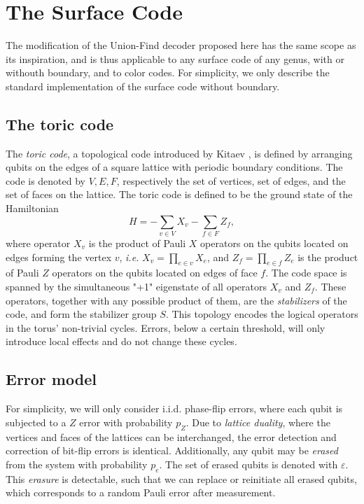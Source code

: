 \section{The Surface Code}\label{sec:surfacecode}

The modification of the Union-Find decoder proposed here has the same scope as its inspiration, and is thus applicable to any surface code of any genus, with or withouth boundary, and to color codes. For simplicity, we only describe the standard implementation of the surface code without boundary.

\subsection{The toric code}

The \emph{toric code}, a topological code introduced by Kitaev \cite{kitaev2003fault}, is defined by arranging qubits on the edges of a square lattice with periodic boundary conditions. The code is denoted by $V,E,F$, respectively the set of vertices, set of edges, and the set of faces on the lattice. The toric code is defined to be the ground state of the Hamiltonian 
\begin{equation}
    H = -\sum_{v \in V} X_v -\sum_{f \in F} Z_f, 
\end{equation}
where operator $X_v$ is the product of Pauli $X$ operators on the qubits located on edges forming the vertex $v$, \emph{i.e.} $X_v = \prod_{e \in v} X_e$, and $Z_f = \prod_{e \in f} Z_e$ is the product of Pauli $Z$ operators on the qubits located on edges of face $f$. The code space is spanned by the simultaneous "+1" eigenstate of all operators $X_v$ and $Z_f$. These operators, together with any possible product of them, are the \emph{stabilizers} of the code, and form the stabilizer group $S$. This topology encodes the logical operators in the torus' non-trivial cycles. Errors, below a certain threshold, will only introduce local effects and do not change these cycles.

\subsection{Error model}
For simplicity, we will only consider i.i.d. phase-flip errors, where each qubit is subjected to a $Z$ error with probability $p_Z$. Due to \emph{lattice duality}, where the vertices and faces of the lattices can be interchanged, the error detection and correction of bit-flip errors is identical. 
Additionally, any qubit may be \emph{erased} from the system with probability $p_e$. The set of erased qubits is denoted with $\varepsilon$. This \emph{erasure} is detectable, such that we can replace or reinitiate all erased qubits, which corresponds to a random Pauli error after measurement. 

